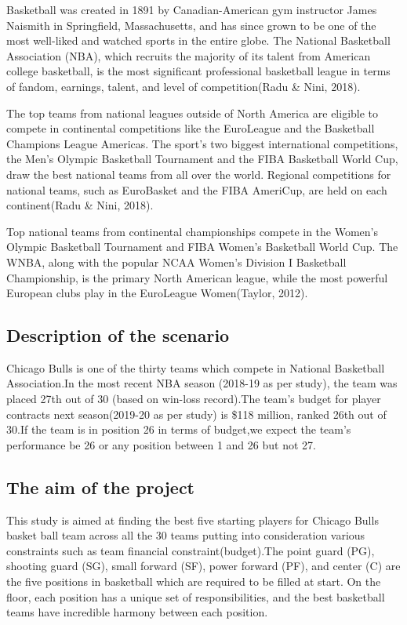 \documentclass[
]{article}
\begin{document}
Basketball was created in 1891 by Canadian-American gym instructor James
Naismith in Springfield, Massachusetts, and has since grown to be one of
the most well-liked and watched sports in the entire globe. The National
Basketball Association (NBA), which recruits the majority of its talent
from American college basketball, is the most significant professional
basketball league in terms of fandom, earnings, talent, and level of
competition(Radu \& Nini, 2018).

The top teams from national leagues outside of North America are
eligible to compete in continental competitions like the EuroLeague and
the Basketball Champions League Americas. The sport's two biggest
international competitions, the Men's Olympic Basketball Tournament and
the FIBA Basketball World Cup, draw the best national teams from all
over the world. Regional competitions for national teams, such as
EuroBasket and the FIBA AmeriCup, are held on each continent(Radu \&
Nini, 2018).

Top national teams from continental championships compete in the Women's
Olympic Basketball Tournament and FIBA Women's Basketball World Cup. The
WNBA, along with the popular NCAA Women's Division I Basketball
Championship, is the primary North American league, while the most
powerful European clubs play in the EuroLeague Women(Taylor, 2012).

\hypertarget{description-of-the-scenario}{%
\subsection{Description of the
scenario}\label{description-of-the-scenario}}

Chicago Bulls is one of the thirty teams which compete in National
Basketball Association.In the most recent NBA season (2018-19 as per
study), the team was placed 27th out of 30 (based on win-loss
record).The team's budget for player contracts next season(2019-20 as
per study) is \$118 million, ranked 26th out of 30.If the team is in
position 26 in terms of budget,we expect the team's performance be 26 or
any position between 1 and 26 but not 27.

\hypertarget{the-aim-of-the-project}{%
\subsection{The aim of the project}\label{the-aim-of-the-project}}

This study is aimed at finding the best five starting players for
Chicago Bulls basket ball team across all the 30 teams putting into
consideration various constraints such as team financial
constraint(budget).The point guard (PG), shooting guard (SG), small
forward (SF), power forward (PF), and center (C) are the five positions
in basketball which are required to be filled at start. On the floor,
each position has a unique set of responsibilities, and the best
basketball teams have incredible harmony between each position.
\end{document}
